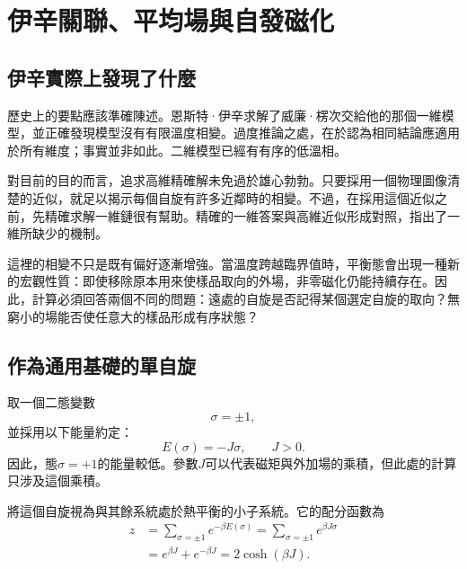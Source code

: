 \chapter{伊辛關聯、平均場與自發磁化}


\section{伊辛實際上發現了什麼}

歷史上的要點應該準確陳述。恩斯特·伊辛求解了威廉·楞次交給他的那個一維模型，並正確發現模型沒有有限溫度相變。過度推論之處，在於認為相同結論應適用於所有維度；事實並非如此。二維模型已經有有序的低溫相。

對目前的目的而言，追求高維精確解未免過於雄心勃勃。只要採用一個物理圖像清楚的近似，就足以揭示每個自旋有許多近鄰時的相變。不過，在採用這個近似之前，先精確求解一維鏈很有幫助。精確的一維答案與高維近似形成對照，指出了一維所缺少的機制。

這裡的相變不只是既有偏好逐漸增強。當溫度跨越臨界值時，平衡態會出現一種新的宏觀性質：即使移除原本用來使樣品取向的外場，非零磁化仍能持續存在。因此，計算必須回答兩個不同的問題：遠處的自旋是否記得某個選定自旋的取向？無窮小的場能否使任意大的樣品形成有序狀態？

\section{作為通用基礎的單自旋}

取一個二態變數
\begin{equation}
\sigma=\pm1,
\end{equation}
並採用以下能量約定：
\begin{equation}
E(\sigma)=-J\sigma,
\qquad J>0.
\end{equation}
因此，態\(\sigma=+1\)的能量較低。參數\(J\)可以代表磁矩與外加場的乘積，但此處的計算只涉及這個乘積。

將這個自旋視為與其餘系統處於熱平衡的小子系統。它的配分函數為
\begin{align}
z
&=\sum_{\sigma=\pm1}e^{-\beta E(\sigma)}
 =\sum_{\sigma=\pm1}e^{\beta J\sigma} \\
&=e^{\beta J}+e^{-\beta J}
 =2\cosh(\beta J).
\end{align}


